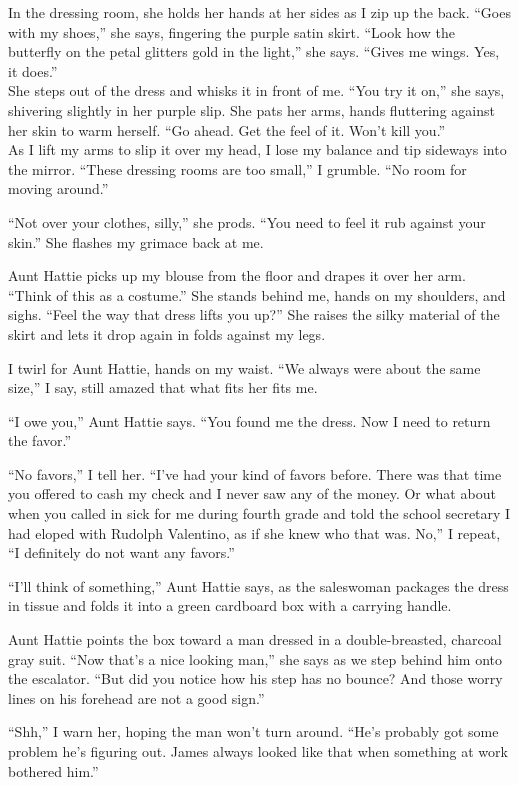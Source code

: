 \documentclass[
]{article}
\begin{document}
In the dressing room, she holds her hands at her sides as I zip up the
back. ``Goes with my shoes,'' she says, fingering the purple satin
skirt. ``Look how the butterfly on the petal glitters gold in the
light,'' she says. ``Gives me wings. Yes, it does.''\\
She steps out of the dress and whisks it in front of me. ``You try it
on,'' she says, shivering slightly in her purple slip. She pats her
arms, hands fluttering against her skin to warm herself. ``Go ahead. Get
the feel of it. Won't kill you.''\\
As I lift my arms to slip it over my head, I lose my balance and tip
sideways into the mirror. ``These dressing rooms are too small,'' I
grumble. ``No room for moving around.''

``Not over your clothes, silly,'' she prods. ``You need to feel it rub
against your skin.'' She flashes my grimace back at me.

Aunt Hattie picks up my blouse from the floor and drapes it over her
arm. ``Think of this as a costume.'' She stands behind me, hands on my
shoulders, and sighs. ``Feel the way that dress lifts you up?'' She
raises the silky material of the skirt and lets it drop again in folds
against my legs.

I twirl for Aunt Hattie, hands on my waist. ``We always were about the
same size,'' I say, still amazed that what fits her fits me.

``I owe you,'' Aunt Hattie says. ``You found me the dress. Now I need to
return the favor.''

``No favors,'' I tell her. ``I've had your kind of favors before. There
was that time you offered to cash my check and I never saw any of the
money. Or what about when you called in sick for me during fourth grade
and told the school secretary I had eloped with Rudolph Valentino, as if
she knew who that was. No,'' I repeat, ``I definitely do not want any
favors.''

``I'll think of something,'' Aunt Hattie says, as the saleswoman
packages the dress in tissue and folds it into a green cardboard box
with a carrying handle.

Aunt Hattie points the box toward a man dressed in a double-breasted,
charcoal gray suit. ``Now that's a nice looking man,'' she says as we
step behind him onto the escalator. ``But did you notice how his step
has no bounce? And those worry lines on his forehead are not a good
sign.''

``Shh,'' I warn her, hoping the man won't turn around. ``He's probably
got some problem he's figuring out. James always looked like that when
something at work bothered him.''
\end{document}
